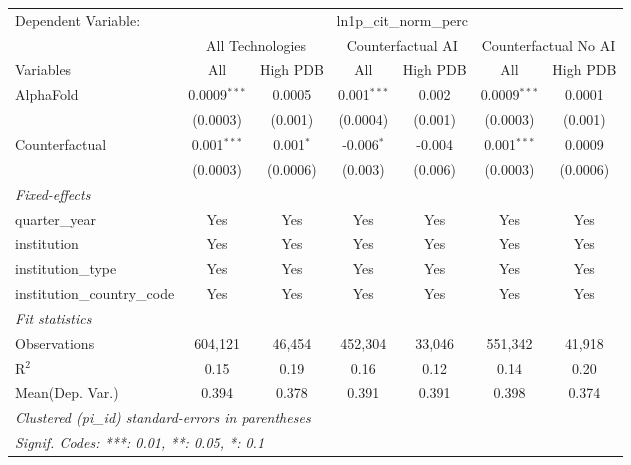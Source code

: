 \begingroup
\centering
\begin{tabular}{lcccccc}
   \tabularnewline \midrule \midrule
   Dependent Variable: & \multicolumn{6}{c}{ln1p\_cit\_norm\_perc}\\
 & \multicolumn{2}{c}{All Technologies} & \multicolumn{2}{c}{Counterfactual AI} & \multicolumn{2}{c}{Counterfactual No AI} \\
\cmidrule(lr){1-1}\cmidrule(lr){2-3} \cmidrule(lr){4-5} \cmidrule(lr){6-7}
Variables & \multicolumn{1}{c}{All} & \multicolumn{1}{c}{High PDB} & \multicolumn{1}{c}{All} & \multicolumn{1}{c}{High PDB} & \multicolumn{1}{c}{All} & \multicolumn{1}{c}{High PDB} \\
\cmidrule(lr){1-1}\cmidrule(lr){2-2} \cmidrule(lr){3-3} \cmidrule(lr){4-4} \cmidrule(lr){5-5} \cmidrule(lr){6-6} \cmidrule(lr){7-7}
   AlphaFold                    & 0.0009$^{***}$ & 0.0005      & 0.001$^{***}$ & 0.002   & 0.0009$^{***}$ & 0.0001\\   
                                & (0.0003)       & (0.001)     & (0.0004)      & (0.001) & (0.0003)       & (0.001)\\   
   Counterfactual               & 0.001$^{***}$  & 0.001$^{*}$ & -0.006$^{*}$  & -0.004  & 0.001$^{***}$  & 0.0009\\   
                                & (0.0003)       & (0.0006)    & (0.003)       & (0.006) & (0.0003)       & (0.0006)\\   
   \midrule
   \emph{Fixed-effects}\\
   quarter\_year                & Yes            & Yes         & Yes           & Yes     & Yes            & Yes\\  
   institution                  & Yes            & Yes         & Yes           & Yes     & Yes            & Yes\\  
   institution\_type            & Yes            & Yes         & Yes           & Yes     & Yes            & Yes\\  
   institution\_country\_code   & Yes            & Yes         & Yes           & Yes     & Yes            & Yes\\  
   \midrule
   \emph{Fit statistics}\\
   Observations                 & 604,121        & 46,454      & 452,304       & 33,046  & 551,342        & 41,918\\  
   R$^2$                        & 0.15           & 0.19        & 0.16          & 0.12    & 0.14           & 0.20\\  
Mean(Dep. Var.) & 0.394 & 0.378 & 0.391 & 0.391 & 0.398 & 0.374 \\
   \midrule \midrule
   \multicolumn{7}{l}{\emph{Clustered (pi\_id) standard-errors in parentheses}}\\
   \multicolumn{7}{l}{\emph{Signif. Codes: ***: 0.01, **: 0.05, *: 0.1}}\\
\end{tabular}
\par\endgroup
